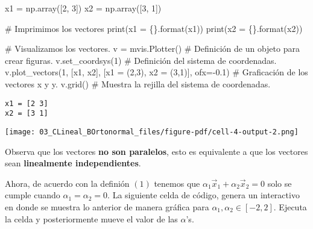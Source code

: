 \documentclass[
  letterpaper,
  DIV=11,
  numbers=noendperiod]{scrreprt}
\newenvironment{Shaded}{\begin{snugshade}}{\end{snugshade}}
\newcommand{\BuiltInTok}[1]{\textcolor[rgb]{0.00,0.23,0.31}{#1}}
\newcommand{\CommentTok}[1]{\textcolor[rgb]{0.37,0.37,0.37}{#1}}
\newcommand{\DecValTok}[1]{\textcolor[rgb]{0.68,0.00,0.00}{#1}}
\newcommand{\FloatTok}[1]{\textcolor[rgb]{0.68,0.00,0.00}{#1}}
\newcommand{\NormalTok}[1]{\textcolor[rgb]{0.00,0.23,0.31}{#1}}
\newcommand{\OperatorTok}[1]{\textcolor[rgb]{0.37,0.37,0.37}{#1}}
\newcommand{\SpecialCharTok}[1]{\textcolor[rgb]{0.37,0.37,0.37}{#1}}
\newcommand{\StringTok}[1]{\textcolor[rgb]{0.13,0.47,0.30}{#1}}
\begin{document}
\begin{Shaded}
\begin{Highlighting}[]
\NormalTok{x1 }\OperatorTok{=}\NormalTok{ np.array([}\DecValTok{2}\NormalTok{, }\DecValTok{3}\NormalTok{]) }
\NormalTok{x2 }\OperatorTok{=}\NormalTok{ np.array([}\DecValTok{3}\NormalTok{, }\DecValTok{1}\NormalTok{])}

\CommentTok{\# Imprimimos los vectores}
\BuiltInTok{print}\NormalTok{(}\StringTok{\textquotesingle{}x1 = }\SpecialCharTok{\{\}}\StringTok{\textquotesingle{}}\NormalTok{.}\BuiltInTok{format}\NormalTok{(x1))}
\BuiltInTok{print}\NormalTok{(}\StringTok{\textquotesingle{}x2 = }\SpecialCharTok{\{\}}\StringTok{\textquotesingle{}}\NormalTok{.}\BuiltInTok{format}\NormalTok{(x2))}

\CommentTok{\# Visualizamos los vectores.}
\NormalTok{v }\OperatorTok{=}\NormalTok{ mvis.Plotter()  }\CommentTok{\# Definición de un objeto para crear figuras.}
\NormalTok{v.set\_coordsys(}\DecValTok{1}\NormalTok{)   }\CommentTok{\# Definición del sistema de coordenadas.}
\NormalTok{v.plot\_vectors(}\DecValTok{1}\NormalTok{, [x1, x2], [}\StringTok{\textquotesingle{}x1 = (2,3)\textquotesingle{}}\NormalTok{, }\StringTok{\textquotesingle{}x2 = (3,1)\textquotesingle{}}\NormalTok{], ofx}\OperatorTok{={-}}\FloatTok{0.1}\NormalTok{) }\CommentTok{\# Graficación de los vectores \textquotesingle{}x\textquotesingle{} y \textquotesingle{}y\textquotesingle{}.}
\NormalTok{v.grid()  }\CommentTok{\# Muestra la rejilla del sistema de coordenadas.}
\end{Highlighting}
\end{Shaded}

\begin{verbatim}
x1 = [2 3]
x2 = [3 1]
\end{verbatim}

\texttt{[image: 03\_CLineal\_BOrtonormal\_files/figure-pdf/cell-4-output-2.png]}

Observa que los vectores \textbf{no son paralelos}, esto es equivalente
a que los vectores sean \textbf{linealmente independientes}.

Ahora, de acuerdo con la definión \((1)\) tenemos que
\(\alpha_1 \vec{x}_1 + \alpha_2 \vec{x}_2 = 0\) solo se cumple cuando
\(\alpha_1 = \alpha_2 = 0\). La siguiente celda de código, genera un
interactivo en donde se muestra lo anterior de manera gráfica para
\(\alpha_1, \alpha_2 \in [-2, 2]\). Ejecuta la celda y posteriormente
mueve el valor de las \(\alpha\)'s.
\end{document}
